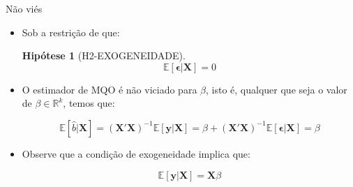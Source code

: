 \documentclass[11pt]{beamer}
\newtheorem{assumption}{Hipótese}
\begin{document}
\begin{frame}{Não viés}
\begin{itemize}
	\item Sob a restrição de que:
\begin{assumption}[H2-EXOGENEIDADE]
	$$\mathbb{E}[\boldsymbol{\epsilon}|\boldsymbol{X}]=0$$
	\end{assumption}
	\item O estimador de MQO é não viciado para $\beta$, isto é, qualquer que seja o valor de $\beta \in \mathbb{R}^k$, temos que:
	
	\begin{equation*}
	\mathbb{E}[\hat{b}|\boldsymbol{X} ]= (\boldsymbol{X}'\boldsymbol{X})^{-1}\mathbb{E}[\boldsymbol{y}|\boldsymbol{X}] =\beta + (\boldsymbol{X}'\boldsymbol{X})^{-1}\mathbb{E}[\boldsymbol{\epsilon}|\boldsymbol{X}]  = \beta 
	\end{equation*}
		\item Observe que a condição de exogeneidade implica que:
	
	$$\mathbb{E}[\boldsymbol{y}|\boldsymbol{X}] = \boldsymbol{X}\beta $$
\end{itemize}
\end{frame}
\end{document}
